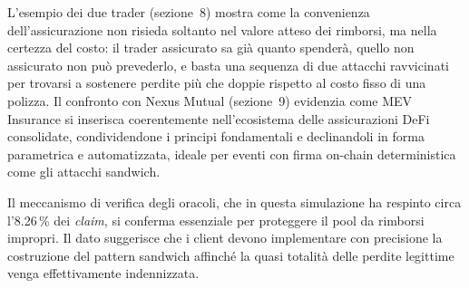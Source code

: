 \documentclass[a4paper,11pt]{article}
\begin{document}
L'esempio dei due trader (sezione~8) mostra come la convenienza
dell'assicurazione non risieda soltanto nel valore atteso dei rimborsi, ma
nella certezza del costo: il trader assicurato sa già quanto spenderà, quello
non assicurato non può prevederlo, e basta una sequenza di due attacchi
ravvicinati per trovarsi a sostenere perdite più che doppie rispetto al costo
fisso di una polizza. Il confronto con Nexus Mutual (sezione~9) evidenzia come
MEV Insurance si inserisca coerentemente nell'ecosistema delle assicurazioni
DeFi consolidate, condividendone i principi fondamentali e declinandoli in
forma parametrica e automatizzata, ideale per eventi con firma on-chain
deterministica come gli attacchi sandwich.

Il meccanismo di verifica degli oracoli, che in questa simulazione ha respinto
circa l'\num{8,26}\,\% dei \emph{claim}, si conferma essenziale per proteggere
il pool da rimborsi impropri. Il dato suggerisce che i client devono
implementare con precisione la costruzione del pattern sandwich affinché la
quasi totalità delle perdite legittime venga effettivamente indennizzata.
\end{document}
